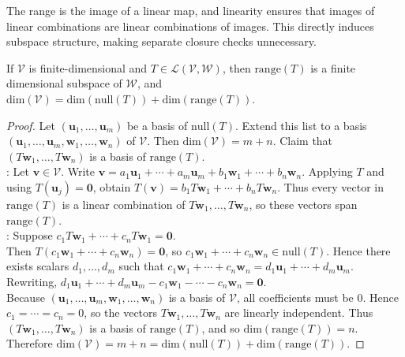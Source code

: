The range is the image of a linear map, and linearity ensures that images of linear combinations are linear combinations of images. This directly induces subspace structure, making separate closure checks unnecessary.

\begin{theorem} \label{thm:ranknullitythm}  If $\mathcal{V}$ is finite-dimensional and $T \in \mathcal{L}(\mathcal{V}, \mathcal{W})$, then $\text{range}(T)$ is a finite dimensional subspace of $\mathcal{W}$, and $\text{dim}(\mathcal{V}) = \text{dim}(\text{null}(T)) + \text{dim}(\text{range}(T))$.
\begin{proof} Let $(\mathbf{u}_1, \ldots, \mathbf{u}_m)$ be a basis of $\text{null}(T)$. Extend this list to a basis $(\mathbf{u}_1, \ldots, \mathbf{u}_m, \mathbf{w}_1, \ldots, \mathbf{w}_n)$ of $\mathcal{V}$. Then $\text{dim}(\mathcal{V}) = m + n$. Claim that $(T \mathbf{w}_1, \ldots, T \mathbf{w}_n)$ is a basis of $\text{range}(T)$.\\
: Let $\mathbf{v} \in \mathcal{V}$. Write $\mathbf{v} = a_1 \mathbf{u}_1 + \cdots + a_m \mathbf{u}_m + b_1 \mathbf{w}_1 + \cdots + b_n \mathbf{w}_n$. Applying $T$ and using $T(\mathbf{u}_j) = \mathbf{0}$, obtain $T(\mathbf{v}) = b_1 T \mathbf{w}_1 + \cdots + b_n T \mathbf{w}_n$. Thus every vector in $\text{range}(T)$ is a linear combination of $T\mathbf{w}_1, \ldots, T\mathbf{w}_n$, so these vectors span $\text{range}(T)$.\\
: Suppose $c_1 T \mathbf{w}_1 + \cdots + c_n T \mathbf{w}_1 = \mathbf{0}$.\\
Then $T(c_1 \mathbf{w}_1 + \cdots + c_n \mathbf{w}_n) = \mathbf{0}$, so $c_1 \mathbf{w}_1 + \cdots + c_n \mathbf{w}_n \in \text{null}(T)$. Hence there exists scalars $d_1, \ldots, d_m$ such that $c_1 \mathbf{w}_1 + \cdots + c_n \mathbf{w}_n = d_1 \mathbf{u}_1 + \cdots + d_m \mathbf{u}_m$. Rewriting, $d_1 \mathbf{u}_1 + \cdots + d_m \mathbf{u}_m - c_1 \mathbf{w}_1 - \cdots - c_n \mathbf{w}_n = \mathbf{0}$.\\
Because $(\mathbf{u}_1, \ldots, \mathbf{u}_m, \mathbf{w}_1, \ldots, \mathbf{w}_n)$ is a basis of $\mathcal{V}$, all coefficients must be $0$. Hence $c_1 = \cdots = c_n = 0$, so the vectors $T \mathbf{w}_1, \ldots, T \mathbf{w}_n$ are linearly independent. Thus $(T\mathbf{w}_1, \ldots, T \mathbf{w}_n)$ is a basis of $\text{range}(T)$, and so $\text{dim}(\text{range}(T)) = n$. Therefore $\text{dim}(\mathcal{V}) = m + n = \text{dim}(\text{null}(T)) + \text{dim}(\text{range}(T))$.
\end{proof}
\end{theorem}

